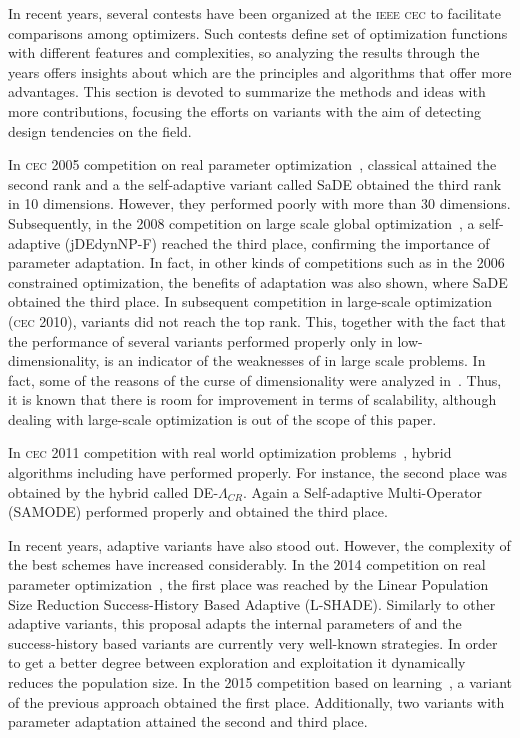 In recent years, several contests have been organized at the \textsc{ieee cec} to facilitate comparisons among optimizers.
%
Such contests define set of optimization functions with different features and complexities, so analyzing the results
through the years offers insights about which are the principles and algorithms that offer more advantages.
%
This section is devoted to summarize the methods and ideas with more contributions, focusing the efforts
on \DE{} variants with the aim of detecting design tendencies on the \DE{} field. 

In \textsc{cec} 2005 competition on real parameter optimization~\cite{CEC2005}, classical \DE{} attained the second rank and a 
the self-adaptive \DE{} variant called SaDE obtained the third rank in 10 dimensions.
%
However, they performed poorly with more than 30 dimensions.
%
Subsequently, in the 2008 competition on large scale global optimization~\cite{CEC2008}, a self-adaptive \DE{} (jDEdynNP-F) 
reached the third place, confirming the importance of parameter adaptation.
%
In fact, in other kinds of competitions such as in the 2006 constrained optimization, the benefits of adaptation 
was also shown, where SaDE obtained the third place.
%
In subsequent competition in large-scale optimization (\textsc{cec} 2010), \DE{} variants did not reach the top rank.
%
This, together with the fact that the performance of several \DE{} variants performed properly only in low-dimensionality, 
is an indicator of the weaknesses of \DE{} in large scale problems.
%
In fact, some of the reasons of the curse of dimensionality were analyzed in~\cite{segura2015improving}.
%
Thus, it is known that there is room for improvement in terms of scalability, although dealing with large-scale optimization is out of 
the scope of this paper.

In \textsc{cec} 2011 competition with real world optimization problems~\cite{CEC2011}, hybrid algorithms including \DE{} have performed
properly.
%
For instance, the second place was obtained by the hybrid \DE{} called DE-$\Lambda_{CR}$.
%
Again a Self-adaptive Multi-Operator \DE{} (SAMODE) performed properly and obtained the third place.

In recent years, adaptive variants have also stood out.
%
However, the complexity of the best schemes have increased considerably.
%
In the 2014 competition on real parameter optimization~\cite{CEC2014}, the first place was reached by the Linear Population Size 
Reduction Success-History Based Adaptive \DE{} (L-SHADE).
%
Similarly to other adaptive variants, this proposal adapts the internal parameters of \DE{} and the success-history based variants
are currently very well-known strategies.
%
In order to get a better degree between exploration and exploitation it dynamically reduces the population size.
%
In the 2015 competition based on learning~\cite{CEC2015}, a variant of the previous approach obtained the first place.
%
Additionally, two \DE{} variants with parameter adaptation attained the second and third place.


